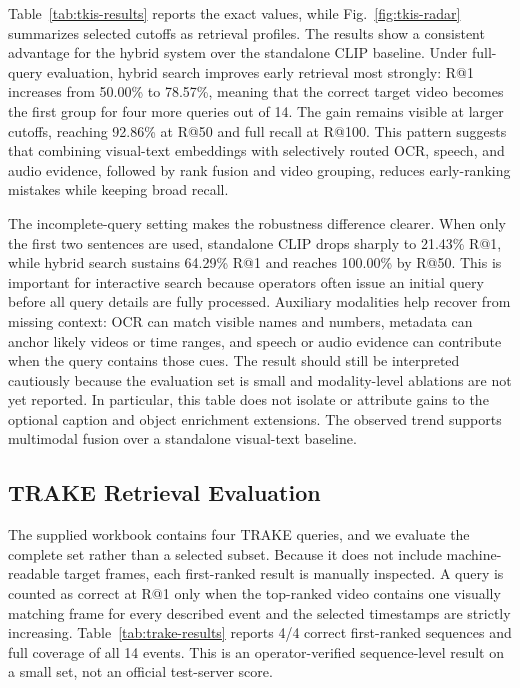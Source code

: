 \documentclass[conference]{IEEEtran}
\begin{document}
Table~\ref{tab:tkis-results} reports the exact values, while
Fig.~\ref{fig:tkis-radar} summarizes selected cutoffs as retrieval profiles.
The results show a consistent advantage for the hybrid system over the
standalone CLIP baseline. Under full-query evaluation, hybrid
search improves early retrieval most strongly: R@1 increases from 50.00\% to
78.57\%, meaning that the correct target video becomes the first group for four
more queries out of 14. The gain remains visible at larger cutoffs, reaching
92.86\% at R@50 and full recall at R@100. This pattern suggests that combining
visual-text embeddings with selectively routed OCR, speech, and audio evidence,
followed by rank fusion and video grouping, reduces early-ranking mistakes while
keeping broad recall.

The incomplete-query setting makes the robustness difference clearer. When only
the first two sentences are used, standalone CLIP drops sharply to 21.43\% R@1,
while hybrid search sustains 64.29\% R@1 and reaches 100.00\% by R@50. This is
important for interactive search because operators often issue an initial query
before all query details are fully processed. Auxiliary modalities help recover
from missing context: OCR can match visible names and numbers, metadata can
anchor likely videos or time ranges, and speech or audio evidence can contribute
when the query contains those cues. The result should still be interpreted
cautiously because the evaluation set is small and modality-level ablations are
not yet reported. In particular, this table does not isolate or attribute gains
to the optional caption and object enrichment extensions. The observed trend
supports multimodal fusion over a standalone visual-text baseline.

\subsection{TRAKE Retrieval Evaluation}
\label{sec:trake-eval}

The supplied workbook contains four TRAKE queries, and we evaluate the complete
set rather than a selected subset. Because it does not include machine-readable
target frames, each first-ranked result is manually inspected. A query is counted
as correct at R@1 only when the top-ranked video contains one visually matching
frame for every described event and the selected timestamps are strictly
increasing. Table~\ref{tab:trake-results} reports 4/4 correct first-ranked
sequences and full coverage of all 14 events. This is an operator-verified
sequence-level result on a small set, not an official test-server score.
\end{document}

